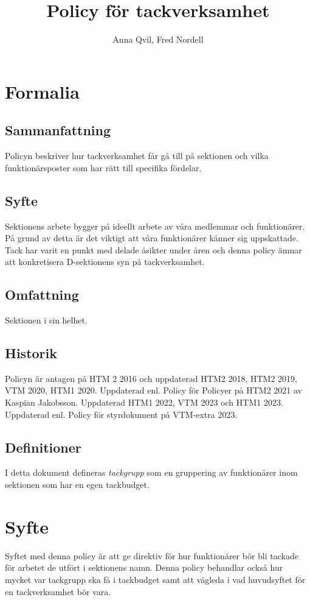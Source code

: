 \documentclass{dsekprotokoll}
\title{Policy för tackverksamhet}
\author{Anna Qvil, Fred Nordell}
\begin{document}
\maketitle
\section{Formalia}
\subsection{Sammanfattning}
Policyn beskriver hur tackverksamhet får gå till på sektionen och vilka funktionärsposter som har rätt till specifika fördelar.

\subsection{Syfte}
Sektionens arbete bygger på ideellt arbete av våra medlemmar och funktionärer. På grund av detta är det viktigt att våra funktionärer känner sig uppskattade. Tack har varit en punkt med delade åsikter under åren och denna policy ämnar att konkretisera D-sektionens syn på tackverksamhet.

\subsection{Omfattning}
Sektionen i sin helhet.

\subsection{Historik}
Policyn är antagen på HTM 2 2016 och uppdaterad HTM2 2018, HTM2 2019, VTM 2020, HTM1 2020.
Uppdaterad enl. Policy för Policyer på HTM2 2021 av Kaspian Jakobsson.
Uppdaterad HTM1 2022, VTM 2023 och HTM1 2023.
Uppdaterad enl. Policy för styrdokument på VTM-extra 2023.

\subsection{Definitioner}
I detta dokument defineras \textit{tackgrupp} som en gruppering
av funktionärer inom sektionen som har en egen tackbudget.



\section{Syfte}
Syftet med denna policy är att ge direktiv för hur funktionärer bör  bli tackade för arbetet de utfört i sektionens namn. Denna policy behandlar också hur mycket var tackgrupp ska få i tackbudget samt att vägleda i vad huvudsyftet för en tackverksamhet bör vara.
\end{document}
